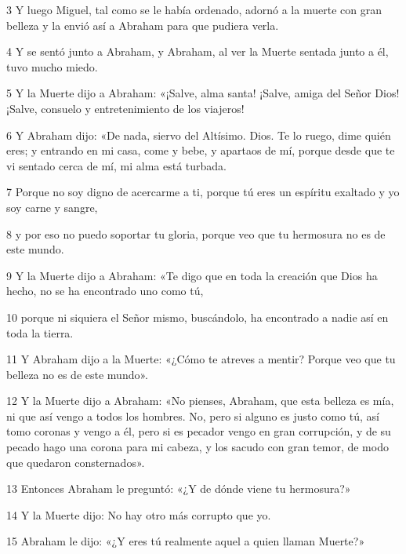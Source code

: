 \par 3 Y luego Miguel, tal como se le había ordenado, adornó a la muerte con gran belleza y la envió así a Abraham para que pudiera verla.

\par 4 Y se sentó junto a Abraham, y Abraham, al ver la Muerte sentada junto a él, tuvo mucho miedo.

\par 5 Y la Muerte dijo a Abraham: «¡Salve, alma santa! ¡Salve, amiga del Señor Dios! ¡Salve, consuelo y entretenimiento de los viajeros!

\par 6 Y Abraham dijo: «De nada, siervo del Altísimo. Dios. Te lo ruego, dime quién eres; y entrando en mi casa, come y bebe, y apartaos de mí, porque desde que te vi sentado cerca de mí, mi alma está turbada.

\par 7 Porque no soy digno de acercarme a ti, porque tú eres un espíritu exaltado y yo soy carne y sangre,

\par 8 y por eso no puedo soportar tu gloria, porque veo que tu hermosura no es de este mundo.

\par 9 Y la Muerte dijo a Abraham: «Te digo que en toda la creación que Dios ha hecho, no se ha encontrado uno como tú,

\par 10 porque ni siquiera el Señor mismo, buscándolo, ha encontrado a nadie así en toda la tierra.

\par 11 Y Abraham dijo a la Muerte: «¿Cómo te atreves a mentir? Porque veo que tu belleza no es de este mundo».

\par 12 Y la Muerte dijo a Abraham: «No pienses, Abraham, que esta belleza es mía, ni que así vengo a todos los hombres. No, pero si alguno es justo como tú, así tomo coronas y vengo a él, pero si es pecador vengo en gran corrupción, y de su pecado hago una corona para mi cabeza, y los sacudo con gran temor, de modo que quedaron consternados».

\par 13 Entonces Abraham le preguntó: «¿Y de dónde viene tu hermosura?»

\par 14 Y la Muerte dijo: No hay otro más corrupto que yo.

\par 15 Abraham le dijo: «¿Y eres tú realmente aquel a quien llaman Muerte?»

